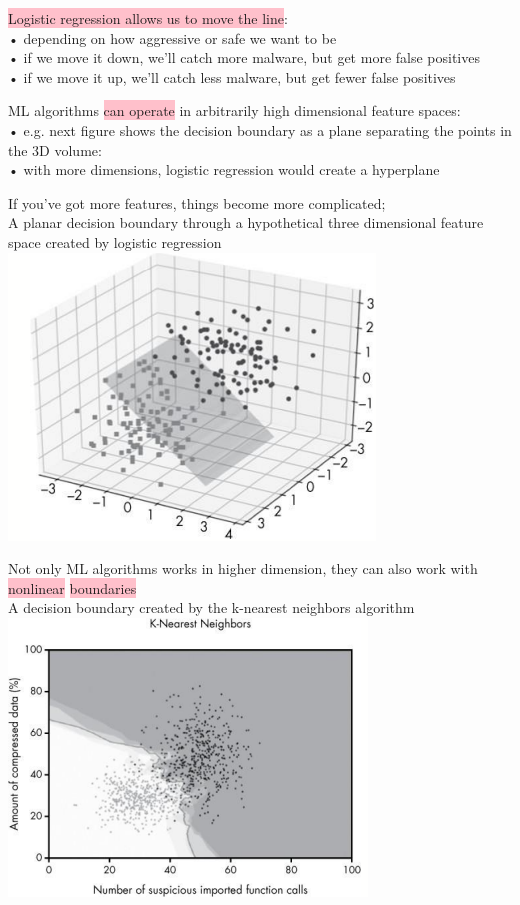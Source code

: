 \documentclass[]{project_plan}
\begin{document}
\colorbox{pink}{Logistic regression allows us to move the line}:\\
• depending on how aggressive or safe we want to be\\
• if we move it down, we’ll catch more malware, but get more false positives\\
• if we move it up, we’ll catch less malware, but get fewer false positives\\

\newpage

ML algorithms \colorbox{pink}{can operate} in arbitrarily high dimensional feature spaces:\\
• e.g. next figure shows the decision boundary as a plane separating the points in the 3D
volume:\\
• with more dimensions, logistic regression would create a hyperplane

If you've got more features, things become more complicated;\\
A planar decision boundary through a hypothetical three dimensional feature space created by logistic regression\\
\includegraphics[width=.6\linewidth]{ml pg 49.png}

Not only ML algorithms works in higher dimension, they can also work with \colorbox{pink}{nonlinear} \colorbox{pink}{boundaries}\\
A decision boundary created by the k-nearest neighbors algorithm\\
\includegraphics[width=.6\linewidth]{mlpg50.png}
\end{document}
